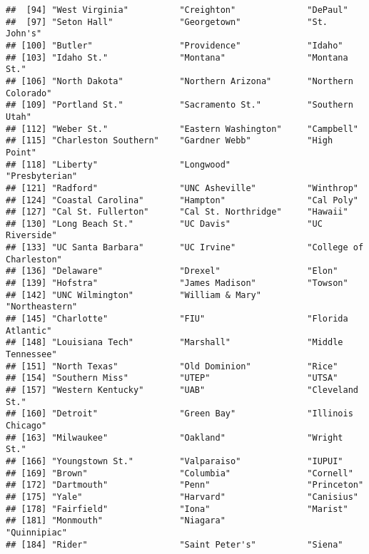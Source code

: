 \documentclass[
]{article}
\begin{document}
\begin{verbatim}
##  [94] "West Virginia"          "Creighton"              "DePaul"                
##  [97] "Seton Hall"             "Georgetown"             "St. John's"            
## [100] "Butler"                 "Providence"             "Idaho"                 
## [103] "Idaho St."              "Montana"                "Montana St."           
## [106] "North Dakota"           "Northern Arizona"       "Northern Colorado"     
## [109] "Portland St."           "Sacramento St."         "Southern Utah"         
## [112] "Weber St."              "Eastern Washington"     "Campbell"              
## [115] "Charleston Southern"    "Gardner Webb"           "High Point"            
## [118] "Liberty"                "Longwood"               "Presbyterian"          
## [121] "Radford"                "UNC Asheville"          "Winthrop"              
## [124] "Coastal Carolina"       "Hampton"                "Cal Poly"              
## [127] "Cal St. Fullerton"      "Cal St. Northridge"     "Hawaii"                
## [130] "Long Beach St."         "UC Davis"               "UC Riverside"          
## [133] "UC Santa Barbara"       "UC Irvine"              "College of Charleston" 
## [136] "Delaware"               "Drexel"                 "Elon"                  
## [139] "Hofstra"                "James Madison"          "Towson"                
## [142] "UNC Wilmington"         "William & Mary"         "Northeastern"          
## [145] "Charlotte"              "FIU"                    "Florida Atlantic"      
## [148] "Louisiana Tech"         "Marshall"               "Middle Tennessee"      
## [151] "North Texas"            "Old Dominion"           "Rice"                  
## [154] "Southern Miss"          "UTEP"                   "UTSA"                  
## [157] "Western Kentucky"       "UAB"                    "Cleveland St."         
## [160] "Detroit"                "Green Bay"              "Illinois Chicago"      
## [163] "Milwaukee"              "Oakland"                "Wright St."            
## [166] "Youngstown St."         "Valparaiso"             "IUPUI"                 
## [169] "Brown"                  "Columbia"               "Cornell"               
## [172] "Dartmouth"              "Penn"                   "Princeton"             
## [175] "Yale"                   "Harvard"                "Canisius"              
## [178] "Fairfield"              "Iona"                   "Marist"                
## [181] "Monmouth"               "Niagara"                "Quinnipiac"            
## [184] "Rider"                  "Saint Peter's"          "Siena"                 

\end{verbatim}
\end{document}
